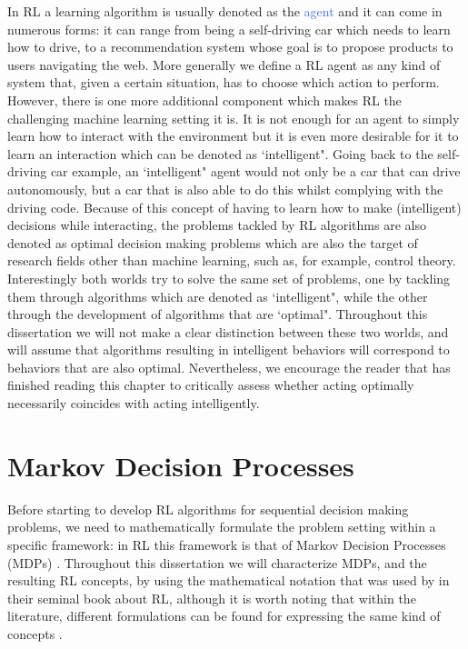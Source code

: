 In RL a learning algorithm is usually denoted as the \textcolor{RoyalBlue}{agent} and it can come in numerous forms: it can range from being a self-driving car which needs to learn how to drive, to a recommendation system whose goal is to propose products to users navigating the web. More generally we define a RL agent as any kind of system that, given a certain situation, has to choose which action to perform. However, there is one more additional component which makes RL the challenging machine learning setting it is.
It is not enough for an agent to simply learn how to interact with the environment but it is even more desirable for it to learn an interaction which can be denoted as `intelligent". Going back to the self-driving car example, an `intelligent" agent would not only be a car that can drive autonomously, but a car that is also able to do this whilst complying with the driving code. Because of this concept of having to learn how to make (intelligent) decisions while interacting, the problems tackled by RL algorithms are also denoted as optimal decision making problems which are also the target of research fields other than machine learning, such as, for example, control theory. Interestingly both worlds try to solve the same set of problems, one by tackling them through algorithms which are denoted as `intelligent", while the other through the development of algorithms that are `optimal". Throughout this dissertation we will not make a clear distinction between these two worlds, and will assume that algorithms resulting in intelligent behaviors will correspond to behaviors that are also optimal. Nevertheless, we encourage the reader that has finished reading this chapter to critically assess whether acting optimally necessarily coincides with acting intelligently.

\section{Markov Decision Processes}
\label{sec:mdps}

Before starting to develop RL algorithms for sequential decision making problems, we need to mathematically formulate the problem setting within a specific framework: in RL this framework is that of Markov Decision Processes (MDPs) \cite{puterman1990markov,puterman2014markov}. Throughout this dissertation we will characterize MDPs, and the resulting RL concepts, by using the mathematical notation that was used by \citet{sutton2018reinforcement} in their seminal book about RL, although it is worth noting that within the literature, different formulations can be found for expressing the same kind of concepts \cite{bertsekas1995neuro,busoniu2010reinforcement,bertsekas2000dynamic,bertsekas2019reinforcement}.

